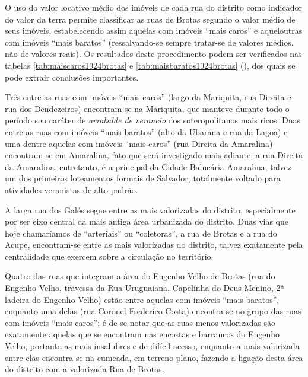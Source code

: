 

O uso do valor locativo médio dos imóveis de cada rua do distrito como indicador do valor da terra permite classificar as ruas de Brotas segundo o valor médio de seus imóveis, estabelecendo assim aquelas com imóveis ``mais caros'' e aqueloutras com imóveis ``mais baratos'' (ressalvando-se sempre tratar-se de valores médios, não de valores reais). Os resultados deste procedimento podem ser verificados nas tabelas \autoref{tab:maiscaros1924brotas} e \autoref{tab:maisbaratos1924brotas} (\pageref{tab:maisbaratos1924brotas}), dos quais se pode extrair conclusões importantes.





Três entre as ruas com imóveis ``mais caros'' (largo da Mariquita, rua Direita e rua dos Dendezeiros) encontram-se na Mariquita, que manteve durante todo o período seu caráter de \textit{arrabalde de veraneio} dos soteropolitanos mais ricos. Duas entre as ruas com imóveis ``mais baratos'' (alto da Ubarana e rua da Lagoa) e uma dentre aquelas com imóveis ``mais caros'' (rua Direita da Amaralina) encontram-se em Amaralina, fato que será investigado mais adiante; a rua Direita da Amaralina, entretanto, é a principal da Cidade Balneária Amaralina, talvez um dos primeiros loteamentos formais de Salvador, totalmente voltado para atividades veranistas de alto padrão.

A larga rua dos Galés segue entre as mais valorizadas do distrito, especialmente por ser eixo central da mais antiga área urbanizada do distrito. Duas vias que hoje chamaríamos de ``arteriais'' ou ``coletoras'', a rua de Brotas e a rua do Acupe, encontram-se entre as mais valorizadas do distrito, talvez exatamente pela centralidade que exercem sobre a circulação no território.

Quatro das ruas que integram a área do Engenho Velho de Brotas (rua do Engenho Velho, travessa da Rua Uruguaiana, Capelinha do Deus Menino, 2ª ladeira do Engenho Velho) estão entre aquelas com imóveis ``mais baratos'', enquanto uma delas (rua Coronel Frederico Costa) encontra-se no grupo das ruas com imóveis ``mais caros''; é de se notar que as ruas menos valorizadas são exatamente aquelas que se encontram nas encostas e barrancos do Engenho Velho, portanto as mais insalubres e de difícil acesso, enquanto a mais valorizada entre elas encontra-se na cumeada, em terreno plano, fazendo a ligação desta área do distrito com a valorizada Rua de Brotas.

